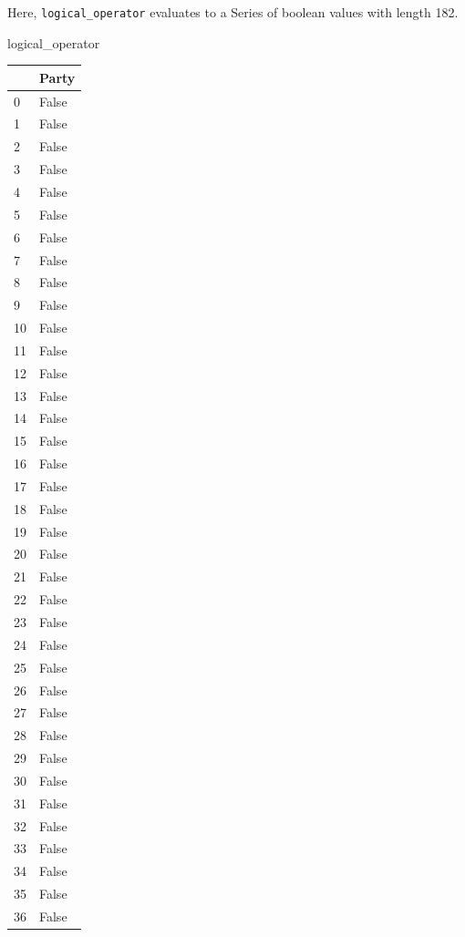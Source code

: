 \documentclass[
  letterpaper,
  DIV=11,
  numbers=noendperiod]{scrreprt}
\newenvironment{Shaded}{\begin{snugshade}}{\end{snugshade}}
\newcommand{\NormalTok}[1]{\textcolor[rgb]{0.00,0.23,0.31}{#1}}
\begin{document}
Here, \texttt{logical\_operator} evaluates to a Series of boolean values
with length 182.

\begin{Shaded}
\begin{Highlighting}[]
\NormalTok{logical\_operator}
\end{Highlighting}
\end{Shaded}

\begin{tabular}{ll}
\toprule
{} &  Party \\
\midrule
0   &  False \\
1   &  False \\
2   &  False \\
3   &  False \\
4   &  False \\
5   &  False \\
6   &  False \\
7   &  False \\
8   &  False \\
9   &  False \\
10  &  False \\
11  &  False \\
12  &  False \\
13  &  False \\
14  &  False \\
15  &  False \\
16  &  False \\
17  &  False \\
18  &  False \\
19  &  False \\
20  &  False \\
21  &  False \\
22  &  False \\
23  &  False \\
24  &  False \\
25  &  False \\
26  &  False \\
27  &  False \\
28  &  False \\
29  &  False \\
30  &  False \\
31  &  False \\
32  &  False \\
33  &  False \\
34  &  False \\
35  &  False \\
36  &  False \\

\end{tabular}
\end{document}
